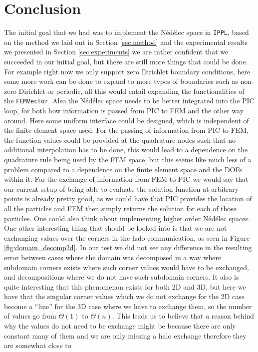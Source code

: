 \chapter{Conclusion}

The initial goal that we had was to implement the Nédélec space in \texttt{IPPL}, based on the method we laid out in Section \ref{sec:method} and the experimental results we presented in Section \ref{sec:experiments} we are rather confident that we succeeded in our initial goal, but there are still more things that could be done. For example right now we only support zero Dirichlet boundary conditions, here some more work can be done to expand to more types of boundaries such as non-zero Dirichlet or periodic, all this would entail expanding the functionalities of the \texttt{FEMVector}. Also the Nédélec space needs to be better integrated into the PIC loop, for both how information is passed from PIC to FEM and the other way around. Here some uniform interface could be designed, which is independent of the finite element space used. For the passing of information from PIC to FEM, the function values could be provided at the quadrature nodes such that no additional interpolation has to be done, this would lead to a dependence on the quadrature rule being used by the FEM space, but this seems like much less of a problem compared to a dependence on the finite element space and the DOFs within it. For the exchange of information from FEM to PIC we would say that our current setup of being able to evaluate the solution function at arbitrary points is already pretty good, as we could have that PIC provides the location of all the particles and FEM then simply returns the solution for each of those particles. One could also think about implementing higher order Nédélec spaces. One other interesting thing that should be looked into is that we are not exchanging values over the corners in the halo communication, as seen in Figure \ref{fig:domain_decomp2d}. In our test we did not see any difference in the resulting error between cases where the domain was decomposed in a way where subdomain corners exists where such corner values would have to be exchanged, and decompositions where we do not have such subdomain corners. It also is quite interesting that this phenomenon exists for both 2D and 3D, but here we have that the singular corner values which we do not exchange for the 2D case become a ``line'' for the 3D case where we have to exchange them, so the number of values go from \(\Theta(1)\) to \(\Theta(n)\). This leads us to believe that a reason behind why the values do not need to be exchange might be because there are only constant many of them and we are only missing a halo exchange therefore they are somewhat close to 